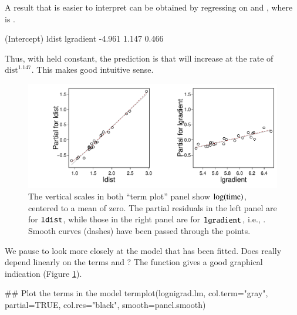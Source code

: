 A result that is easier to interpret can be obtained by regressing
 on  and ,
where  is .
\begin{Schunk}
\begin{Soutput}
(Intercept)       ldist   lgradient 
     -4.961       1.147       0.466 
\end{Soutput}
\end{Schunk}
Thus, with  held constant, the prediction is that 
will increase at the rate of $\mbox{dist}^{1.147}$.  This makes good intuitive
sense.

\begin{figure}
\begin{Schunk}


\centerline{\includegraphics[width=\textwidth]{figs/8-tplot-ni-1} }

\end{Schunk}
\caption{The vertical scales in both ``term plot''  panel
  show $\log(\rm{time})$, centered to a mean of zero. The partial residuals
  in the left panel are for $\texttt{ldist}$, while those in the right
  panel are for $\texttt{lgradient}$, i.e.,
  . Smooth curves (dashes) have been passed
  through the points.\label{fig:lnihills-lin}}
\vspace*{-5pt}
\end{figure}

We pause to look more closely at the model that has been fitted.  Does
 really depend linearly on the terms  and
?  The function  gives a good
graphical indication (Figure \ref{fig:lnihills-lin}).
\begin{Schunk}
\begin{Sinput}
## Plot the terms in the model
termplot(lognigrad.lm, col.term="gray", partial=TRUE,
         col.res="black", smooth=panel.smooth)
\end{Sinput}
\end{Schunk}


